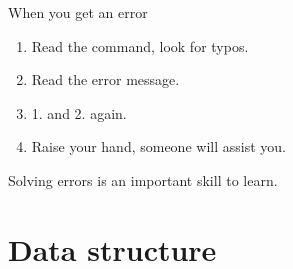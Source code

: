 \documentclass[10pt]{beamer}
\begin{document}
\begin{frame}{When you get an error}

  \begin{block}{}
    \begin{enumerate}
    \item Read the command, look for typos.
    \item Read the error message.
    \item 1. and 2. again.
    \item Raise your hand, someone will assist you.
    \end{enumerate}    
  \end{block}
  
  \begin{block}{}
    Solving errors is an important skill to learn.
  \end{block}
  
\end{frame}







\section{Data structure}
\end{document}
